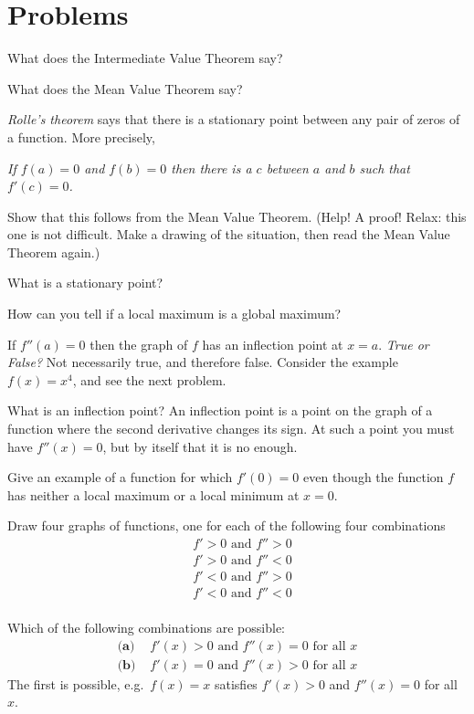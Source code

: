 \section{Problems}
\problemfont
\begin{multicols}{2}\setlength{\parindent}{0pt}

\problem What does the Intermediate Value Theorem say?

\problem What does the Mean Value Theorem say?

\problem  \textit{Rolle's theorem} says that there is a stationary
point between any pair of zeros of a function.  More precisely,
\begin{center}
  \rmfamily\itshape If $f(a) = 0$ and $f(b)=0$ then there is a $c$
  between $a$ and $b$ such that $f'(c) = 0$.
\end{center}
Show that this follows from the Mean Value Theorem.  (Help! A proof! Relax:
this one is not difficult. Make a drawing of the situation, then read the
Mean Value Theorem again.)

\problem What is a stationary point?

\problem \groupproblem How can you tell if a local maximum is a global
maximum?

\problem \groupproblem If $f''(a) = 0$ then the graph of $f$ has an
inflection point at $x=a$.  \emph{True or False?}
\answer
Not necessarily true, and therefore false.  Consider the example
$f(x)=x^4$, and see the next problem.
\endanswer

\problem What is an inflection point?
\answer
An inflection point is a point on the graph of a function where the
second derivative changes its sign.  At such a point you must have
$f''(x) = 0$, but by itself that it is no enough.
\endanswer

\problem Give an example of a function for which $f'(0)=0$ even though the
function $f$ has neither a local maximum or a local minimum at $x=0$.

\problem \groupproblem Draw four graphs of functions, one for each of
the following four combinations
\begin{align*}
  &f'>0\text{ and } f''>0 \\   &f'>0\text{ and } f''<0 \\
  &f'<0\text{ and } f''>0 \\   &f'<0\text{ and } f''<0 \\
\end{align*}

\problem \groupproblem Which of the following combinations are possible:
\begin{align*}
  \textbf{(a)~}& f'(x)>0 \text{ and } f''(x)=0 \text{ for all } x \\
  \textbf{(b)~}& f'(x)=0 \text{ and } f''(x)>0 \text{ for all } x
\end{align*}
\answer
The first is possible, e.g.~$f(x) = x$ satisfies $f'(x)>0$ and
$f''(x)=0$ for all $x$.


\end{multicols}

